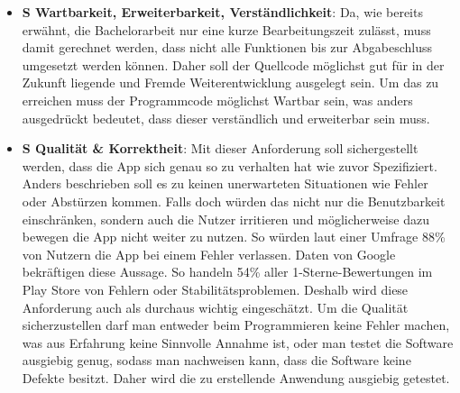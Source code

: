 \begin{itemize}
		
	\item \textbf{S Wartbarkeit, Erweiterbarkeit, Verständlichkeit}: %
		Da, wie bereits erwähnt, die Bachelorarbeit nur eine kurze Bearbeitungszeit zulässt, muss damit gerechnet werden, dass nicht alle Funktionen bis zur Abgabeschluss umgesetzt werden können. %
		Daher soll der Quellcode möglichst gut für in der Zukunft liegende und Fremde Weiterentwicklung ausgelegt sein. %
		Um das zu erreichen muss der Programmcode möglichst Wartbar sein, was anders ausgedrückt bedeutet, dass dieser verständlich und erweiterbar sein muss.\newline%
		

	\item \textbf{S Qualität \& Korrektheit}: %
		Mit dieser Anforderung soll sichergestellt werden, dass die App sich genau so zu verhalten hat wie zuvor Spezifiziert. Anders beschrieben soll es zu keinen unerwarteten Situationen wie Fehler oder Abstürzen kommen. %
		Falls doch würden das nicht nur die Benutzbarkeit einschränken, sondern auch die Nutzer irritieren und möglicherweise dazu bewegen die App nicht weiter zu nutzen. %
			So würden laut einer Umfrage 88\% von Nutzern die App bei einem Fehler verlassen\cite{nfA_bugsAbandon}. Daten von Google bekräftigen diese Aussage. So handeln 54\% aller 1-Sterne-Bewertungen im Play Store von Fehlern oder Stabilitätsproblemen\cite{nfA_bugsReview}. %
			Deshalb wird diese Anforderung auch als durchaus wichtig eingeschätzt.\newline%
		Um die Qualität sicherzustellen darf man entweder beim Programmieren keine Fehler machen, was aus Erfahrung keine Sinnvolle Annahme ist, oder man testet die Software ausgiebig genug, sodass man nachweisen kann, dass die Software keine Defekte besitzt. 
		Daher wird die zu erstellende Anwendung ausgiebig getestet. %
	

\end{itemize}
